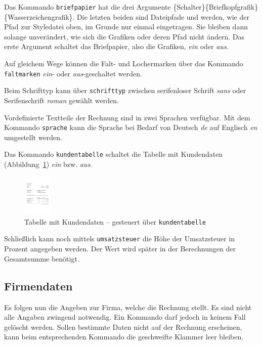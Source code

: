 \documentclass[11pt,pdftex]{scrartcl}
\newcommand{\bs}{\symbol{'134}}
\newcommand{\Cmd}[1]{\texttt{\def\{{\char`\{}\def\}{\char`\}}\bs#1}}
\begin{document}
Das Kommando \Cmd{briefpapier} hat die drei Argumente \{Schalter\}\{Briefkopfgrafik\}\{Wasser\-zei\-chen\-grafik\}. Die letzten beiden sind Dateipfade und werden, wie der Pfad zur Styledatei oben, im Grunde nur einmal eingetragen. Sie bleiben dann solange unverändert, wie sich die Grafiken oder deren Pfad nicht ändern. Das erste Argument schaltet das Briefpapier, also die Grafiken, \emph{ein} oder \emph{aus}.

Auf gleichem Wege können die Falt- und Lochermarken über das Kommando \Cmd{faltmarken} \emph{ein}- oder \emph{aus}-geschaltet werden.

Beim Schrifttyp kann über \Cmd{schrifttyp} zwischen serifenloser Schrift \emph{sans} oder Serifenschrift \emph{roman} gewählt werden.

Vordefinierte Textteile der Rechnung sind in zwei Sprachen verfügbar. Mit dem Kommando \Cmd{sprache} kann die Sprache bei Bedarf von Deutsch \emph{de} auf Englisch \emph{en} umgestellt werden.

Das Kommando \Cmd{kundentabelle} schaltet die Tabelle mit Kundendaten (Abbildung~\ref{kundentab}) \emph{ein} bzw. \emph{aus}.

\begin{figure}[htbp]
\begin{center}
\includegraphics[height=2cm]{kundentabelle}

\vspace{-1em}

\caption{Tabelle mit Kundendaten -- gesteuert über \Cmd{kundentabelle}}
\label{kundentab}
\end{center}
\end{figure}

Schließlich kann noch mittels \Cmd{umsatzsteuer} die Höhe der Umsatzsteuer in Prozent angegeben werden. Der Wert wird später in der Berechnungen der Gesamtsumme benötigt.

\subsection{Firmendaten}

Es folgen nun die Angeben zur Firma, welche die Rechnung stellt. Es sind nicht alle Angaben zwingend notwendig. Ein Kommando darf jedoch in keinem Fall gelöscht werden. Sollen bestimmte Daten nicht auf der Rechnung erscheinen, kann beim entsprechenden Kommando die geschweifte Klammer leer bleiben.
\end{document}
